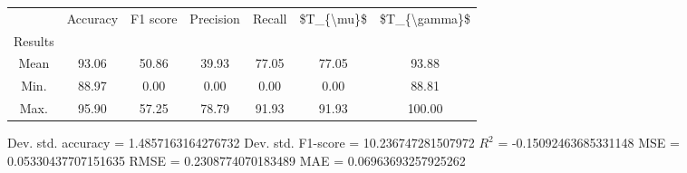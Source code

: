 \begin{tabular}{|c|c|c|c|c|c|c|}
\toprule
{} &  Accuracy &  F1 score &  Precision &  Recall &  \$T\_\{\textbackslash mu\}\$ &  \$T\_\{\textbackslash gamma\}\$ \\
Results &           &           &            &         &            &               \\
\hline
Mean    &     93.06 &     50.86 &      39.93 &   77.05 &      77.05 &         93.88 \\
Min.    &     88.97 &      0.00 &       0.00 &    0.00 &       0.00 &         88.81 \\
Max.    &     95.90 &     57.25 &      78.79 &   91.93 &      91.93 &        100.00 \\
\bottomrule
\end{tabular}

 Dev. std. accuracy = 1.4857163164276732
 Dev. std. F1-score = 10.236747281507972
 $R^2$ = -0.15092463685331148
 MSE = 0.05330437707151635
 RMSE = 0.2308774070183489
 MAE = 0.06963693257925262